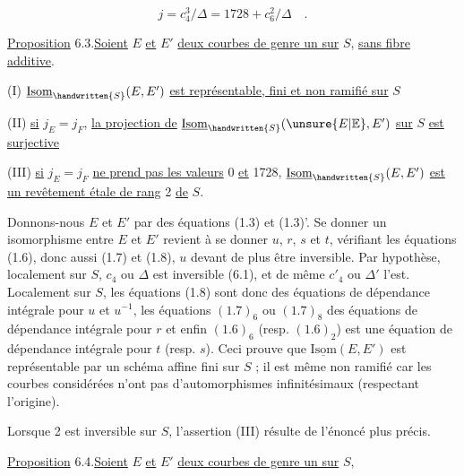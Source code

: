 \[
j=c_4^3/\Delta=1728+c_6^2/\Delta\quad .\tag*{(6.2)}
\]

\uline{Proposition} 6.3.\qquad \uline{Soient} $E$ \uline{et} $E'$ \uline{deux courbes de genre un sur} $S$, \uline{sans fibre additive}.

(I) $\underline{\mathrm{Isom}}_{\handwritten{S}}(E,E')$ \uline{est représentable, fini et non ramifié sur} $S$

(II) \uline{si} $j_E=j_F$, \uline{la projection de} $\underline{\mathrm{Isom}}_{\handwritten{S}}(\unsure{E|\mathbb E},E')$ \uline{sur} $S$ \uline{est surjective}

(III) \uline{si} $j_E=j_F$ \uline{ne prend pas les valeurs} 0 \uline{et} 1728, $\underline{\mathrm{Isom}}_{\handwritten{S}}(E,E')$ \uline{est un revêtement étale de rang} 2 \uline{de} $S$.

Donnons-nous $E$ et $E'$ par des équations (1.3) et (1.3)'. Se donner un isomorphisme entre $E$ et $E'$ revient à se donner $u$, $r$, $s$ et $t$, vérifiant les équations (1.6), donc aussi (1.7) et (1.8), $u$ devant de plus être inversible. Par hypothèse, localement sur $S$, $c_4$ ou $\Delta$ est inversible (6.1), et de même $c'_4$ ou $\Delta'$ l'est. Localement sur $S$, les équations (1.8) sont donc des équations de dépendance intégrale pour $u$ et $u^{-1}$, les équations $(1.7)_6$ ou $(1.7)_8$ des équations de dépendance intégrale pour $r$ et enfin $(1.6)_6$ (resp. $(1.6)_2$) est une équation de dépendance intégrale pour $t$ (resp. $s$). Ceci prouve que $\underline{\mathrm{Isom}}(E,E')$ est représentable par un schéma affine fini sur $S$ ; il est même non ramifié car les courbes considérées n'ont pas d'automorphismes infinitésimaux (respectant l'origine).

Lorsque 2 est inversible sur $S$, l'assertion (III) résulte de l'énoncé plus précis.

\uline{Proposition} 6.4.\qquad \uline{Soient} $E$ \uline{et} $E'$ \uline{deux courbes de genre un sur} $S$,
